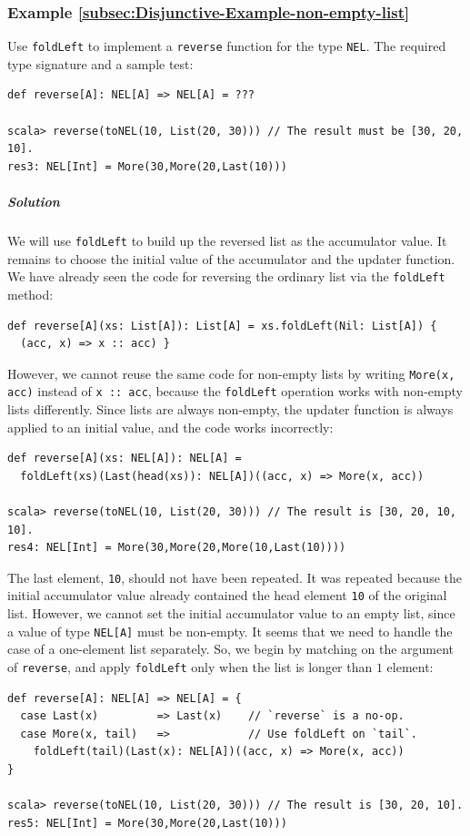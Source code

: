 \subsubsection{Example \label{subsec:Disjunctive-Example-non-empty-list}\ref{subsec:Disjunctive-Example-non-empty-list}}

Use \lstinline!foldLeft! to implement a \lstinline!reverse! function
for the type \lstinline!NEL!. The required type signature and a sample
test:
\begin{lstlisting}
def reverse[A]: NEL[A] => NEL[A] = ???

scala> reverse(toNEL(10, List(20, 30))) // The result must be [30, 20, 10].
res3: NEL[Int] = More(30,More(20,Last(10)))
\end{lstlisting}


\subparagraph{Solution}

We will use \lstinline!foldLeft! to build up the reversed list as
the accumulator value. It remains to choose the initial value of the
accumulator and the updater function. We have already seen the code
for reversing the ordinary list via the \lstinline!foldLeft! method:
\begin{lstlisting}
def reverse[A](xs: List[A]): List[A] = xs.foldLeft(Nil: List[A]) {
  (acc, x) => x :: acc) }
\end{lstlisting}
However, we cannot reuse the same code for non-empty lists by writing
\lstinline!More(x, acc)! instead of \lstinline!x :: acc!, because
the \lstinline!foldLeft! operation works with non-empty lists differently.
Since lists are always non-empty, the updater function is always applied
to an initial value, and the code works incorrectly:
\begin{lstlisting}
def reverse[A](xs: NEL[A]): NEL[A] =
  foldLeft(xs)(Last(head(xs)): NEL[A])((acc, x) => More(x, acc))

scala> reverse(toNEL(10, List(20, 30))) // The result is [30, 20, 10, 10].
res4: NEL[Int] = More(30,More(20,More(10,Last(10))))
\end{lstlisting}
The last element, \lstinline!10!, should not have been repeated.
It was repeated because the initial accumulator value already contained
the head element \lstinline!10! of the original list. However, we
cannot set the initial accumulator value to an empty list, since a
value of type \lstinline!NEL[A]! must be non-empty. It seems that
we need to handle the case of a one-element list separately. So, we
begin by matching on the argument of \lstinline!reverse!, and apply
\lstinline!foldLeft! only when the list is longer than $1$ element:
\begin{lstlisting}
def reverse[A]: NEL[A] => NEL[A] = {
  case Last(x)         => Last(x)    // `reverse` is a no-op.
  case More(x, tail)   =>            // Use foldLeft on `tail`.
    foldLeft(tail)(Last(x): NEL[A])((acc, x) => More(x, acc))
}

scala> reverse(toNEL(10, List(20, 30))) // The result is [30, 20, 10].
res5: NEL[Int] = More(30,More(20,Last(10)))
\end{lstlisting}



